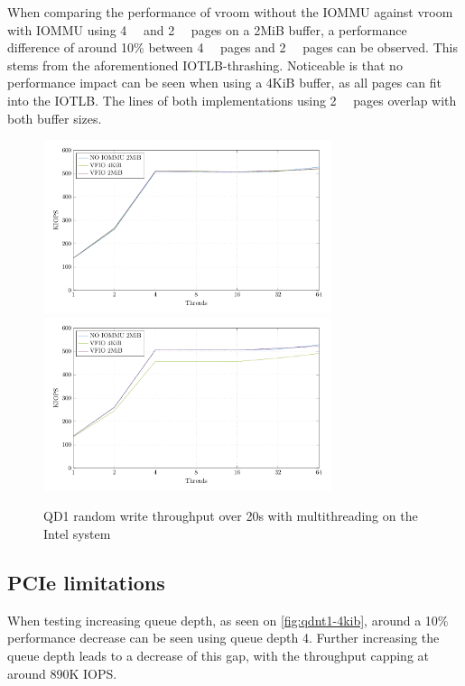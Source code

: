 When comparing the performance of vroom without the IOMMU against vroom with IOMMU using \qty{4}{\kibi\byte} and \qty{2}{\mebi\byte} pages on a 2MiB buffer, a performance difference of around 10\% between \qty{4}{\kibi\byte} pages and \qty{2}{\mebi\byte} pages can be observed. This stems from the aforementioned IOTLB-thrashing. Noticeable is that no performance impact can be seen when using a 4KiB buffer, as all pages can fit into the IOTLB. The lines of both implementations using \qty{2}{\mebi\byte} pages overlap with both buffer sizes.

\begin{figure}[H]
  \centering
   {\includegraphics[width=0.75\textwidth]{figures/qd1tn_1page}}
   {\includegraphics[width=0.75\textwidth]{figures/qd1tn_512page}}
  \caption{QD1 random write throughput over 20s with multithreading on the Intel system}
  \label{fig:qd1tn_4kib}
\end{figure}

\subsection{PCIe limitations}
When testing increasing queue depth, as seen on \autoref{fig:qdnt1-4kib}, around a 10\% performance decrease can be seen using queue depth 4. Further increasing the queue depth leads to a decrease of this gap, with the throughput capping at around 890K IOPS.

